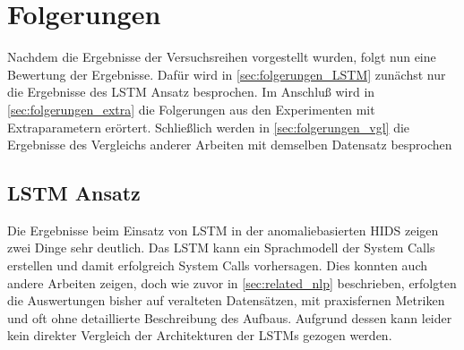 \chapter{Folgerungen}\label{ch:folgerungen}
Nachdem die Ergebnisse der Versuchsreihen vorgestellt wurden, folgt nun eine Bewertung der Ergebnisse.
Dafür wird in \autoref{sec:folgerungen_LSTM} zunächst nur die Ergebnisse des \ac{LSTM} Ansatz besprochen.
Im Anschluß wird in \autoref{sec:folgerungen_extra} die Folgerungen aus den Experimenten mit Extraparametern erörtert. 
Schließlich werden in \autoref{sec:folgerungen_vgl} die Ergebnisse des Vergleichs anderer Arbeiten mit demselben Datensatz besprochen

\section{LSTM Ansatz}\label{sec:folgerungen_LSTM}

Die Ergebnisse beim Einsatz von \ac{LSTM} in der anomaliebasierten \ac{HIDS} zeigen zwei Dinge sehr deutlich.
Das \ac{LSTM} kann ein Sprachmodell der System Calls erstellen und damit erfolgreich System Calls vorhersagen.
Dies konnten auch andere Arbeiten zeigen, doch wie zuvor in \autoref{sec:related_nlp} beschrieben, erfolgten die Auswertungen bisher auf veralteten Datensätzen, mit praxisfernen Metriken und oft ohne detaillierte Beschreibung des Aufbaus.
Aufgrund dessen kann leider kein direkter Vergleich der Architekturen der \acp{LSTM} gezogen werden.

